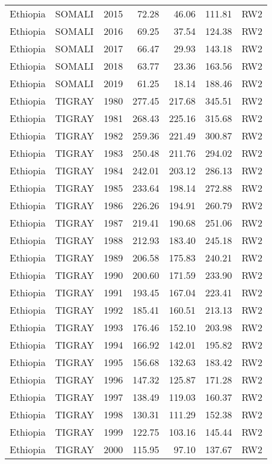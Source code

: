\begin{longtable}{lllrrrl}
  Ethiopia & SOMALI & 2015 & 72.28 & 46.06 & 111.81 & RW2 \\ 
  Ethiopia & SOMALI & 2016 & 69.25 & 37.54 & 124.38 & RW2 \\ 
  Ethiopia & SOMALI & 2017 & 66.47 & 29.93 & 143.18 & RW2 \\ 
  Ethiopia & SOMALI & 2018 & 63.77 & 23.36 & 163.56 & RW2 \\ 
  Ethiopia & SOMALI & 2019 & 61.25 & 18.14 & 188.46 & RW2 \\ 
  Ethiopia & TIGRAY & 1980 & 277.45 & 217.68 & 345.51 & RW2 \\ 
  Ethiopia & TIGRAY & 1981 & 268.43 & 225.16 & 315.68 & RW2 \\ 
  Ethiopia & TIGRAY & 1982 & 259.36 & 221.49 & 300.87 & RW2 \\ 
  Ethiopia & TIGRAY & 1983 & 250.48 & 211.76 & 294.02 & RW2 \\ 
  Ethiopia & TIGRAY & 1984 & 242.01 & 203.12 & 286.13 & RW2 \\ 
  Ethiopia & TIGRAY & 1985 & 233.64 & 198.14 & 272.88 & RW2 \\ 
  Ethiopia & TIGRAY & 1986 & 226.26 & 194.91 & 260.79 & RW2 \\ 
  Ethiopia & TIGRAY & 1987 & 219.41 & 190.68 & 251.06 & RW2 \\ 
  Ethiopia & TIGRAY & 1988 & 212.93 & 183.40 & 245.18 & RW2 \\ 
  Ethiopia & TIGRAY & 1989 & 206.58 & 175.83 & 240.21 & RW2 \\ 
  Ethiopia & TIGRAY & 1990 & 200.60 & 171.59 & 233.90 & RW2 \\ 
  Ethiopia & TIGRAY & 1991 & 193.45 & 167.04 & 223.41 & RW2 \\ 
  Ethiopia & TIGRAY & 1992 & 185.41 & 160.51 & 213.13 & RW2 \\ 
  Ethiopia & TIGRAY & 1993 & 176.46 & 152.10 & 203.98 & RW2 \\ 
  Ethiopia & TIGRAY & 1994 & 166.92 & 142.01 & 195.82 & RW2 \\ 
  Ethiopia & TIGRAY & 1995 & 156.68 & 132.63 & 183.42 & RW2 \\ 
  Ethiopia & TIGRAY & 1996 & 147.32 & 125.87 & 171.28 & RW2 \\ 
  Ethiopia & TIGRAY & 1997 & 138.49 & 119.03 & 160.37 & RW2 \\ 
  Ethiopia & TIGRAY & 1998 & 130.31 & 111.29 & 152.38 & RW2 \\ 
  Ethiopia & TIGRAY & 1999 & 122.75 & 103.16 & 145.44 & RW2 \\ 
  Ethiopia & TIGRAY & 2000 & 115.95 & 97.10 & 137.67 & RW2 \\ 

\end{longtable}

